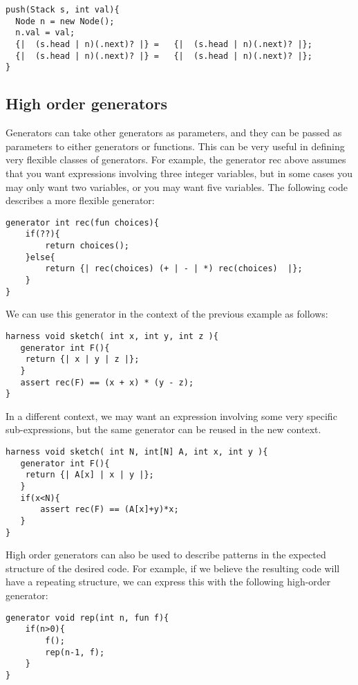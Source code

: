 \begin{lstlisting}
push(Stack s, int val){
  Node n = new Node();
  n.val = val;
  {|  (s.head | n)(.next)? |} =   {|  (s.head | n)(.next)? |};
  {|  (s.head | n)(.next)? |} =   {|  (s.head | n)(.next)? |};
}
\end{lstlisting}

\subsection{High order generators}

Generators can take other generators as parameters, and they can be passed as parameters to either generators or functions. This can be very useful in defining very flexible classes of generators. For example, the generator rec above assumes that you want expressions involving three integer variables, but in some cases you may only want two variables, or you may want five variables. The following code describes a more flexible generator: 

\begin{lstlisting}
generator int rec(fun choices){ 
    if(??){ 
        return choices();
    }else{
        return {| rec(choices) (+ | - | *) rec(choices)  |};
    }
}
\end{lstlisting}

We can use this generator in the context of the previous example as follows:
\begin{lstlisting}
harness void sketch( int x, int y, int z ){
   generator int F(){
	return {| x | y | z |};
   }
   assert rec(F) == (x + x) * (y - z);
}
\end{lstlisting}

In a different context, we may want an expression involving some very specific sub-expressions, but the same generator can be reused in the new context.
\begin{lstlisting}
harness void sketch( int N, int[N] A, int x, int y ){   
   generator int F(){
	return {| A[x] | x | y |};
   }
   if(x<N){
	   assert rec(F) == (A[x]+y)*x;
   }
}
\end{lstlisting}

High order generators can also be used to describe patterns in the expected structure of the desired code. For example, if we believe the resulting code will have a repeating structure, we can express this with the following high-order generator: 

\begin{lstlisting}
generator void rep(int n, fun f){
    if(n>0){
        f();
        rep(n-1, f);
    }    
}
\end{lstlisting}


